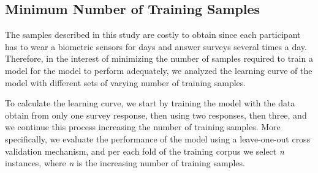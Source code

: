 
\subsection{Minimum Number of Training Samples} \label{secLearningCurve}

The samples described in this study are costly to obtain since each participant
has to wear a biometric sensors for days and answer
surveys several times a day. Therefore, in the 
interest of minimizing the number of samples required to 
train a model for the 
model to perform adequately, we analyzed the learning
curve of the model with different sets of varying number of 
training samples.

To calculate the learning curve, we start by training the model with the
data obtain from only one survey response, then 
using two responses, then three, and we continue this process
increasing the number of training samples. 
More specifically, we evaluate
the performance of the model using a leave-one-out 
cross validation mechanism, and per each fold of the 
training corpus we select  \textit{n} instances, 
where \textit{n} is the increasing number of training samples.


